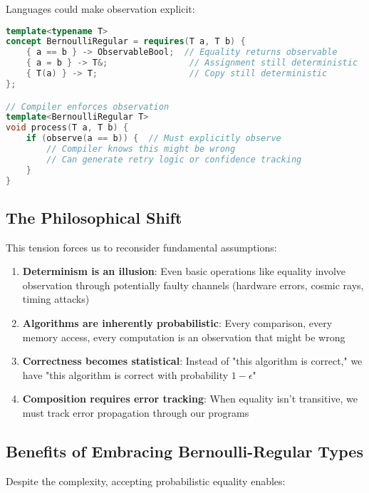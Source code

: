 Languages could make observation explicit:

\begin{lstlisting}[language=C++, caption={Hypothetical type system with observation}]
template<typename T>
concept BernoulliRegular = requires(T a, T b) {
    { a == b } -> ObservableBool;  // Equality returns observable
    { a = b } -> T&;                // Assignment still deterministic
    { T(a) } -> T;                  // Copy still deterministic
};

// Compiler enforces observation
template<BernoulliRegular T>
void process(T a, T b) {
    if (observe(a == b)) {  // Must explicitly observe
        // Compiler knows this might be wrong
        // Can generate retry logic or confidence tracking
    }
}
\end{lstlisting}

\subsection{The Philosophical Shift}

This tension forces us to reconsider fundamental assumptions:

\begin{enumerate}
\item \textbf{Determinism is an illusion}: Even basic operations like equality involve observation through potentially faulty channels (hardware errors, cosmic rays, timing attacks)

\item \textbf{Algorithms are inherently probabilistic}: Every comparison, every memory access, every computation is an observation that might be wrong

\item \textbf{Correctness becomes statistical}: Instead of "this algorithm is correct," we have "this algorithm is correct with probability $1 - \epsilon$"

\item \textbf{Composition requires error tracking}: When equality isn't transitive, we must track error propagation through our programs
\end{enumerate}

\subsection{Benefits of Embracing Bernoulli-Regular Types}

Despite the complexity, accepting probabilistic equality enables:

